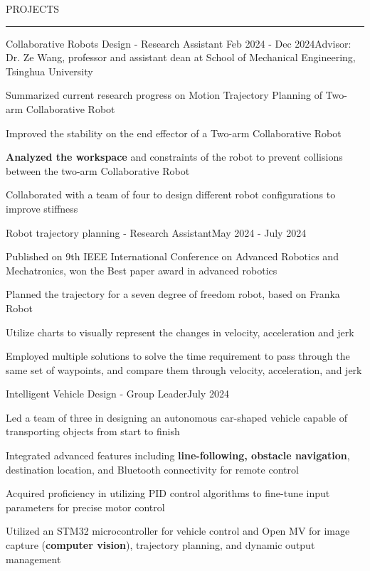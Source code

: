 \documentclass{resume} %
\renewenvironment{rSection}[1]{
\sectionskip
\textcolor{TsinghuaPurple}{\MakeUppercase{#1}}
\sectionlineskip
\hrule
\begin{list}{}{
\setlength{\leftmargin}{0em}
}
\item[]
}{
\end{list}
}
\begin{document}
\begin{rSection}{PROJECTS}

\begin{rSubsection}{Collaborative Robots Design - Research Assistant} {Feb 2024 - Dec 2024}{Advisor: Dr. Ze Wang, professor and assistant dean at School of Mechanical Engineering, Tsinghua University}{}

\item Summarized current research progress on Motion Trajectory Planning of Two-arm Collaborative Robot
\item Improved the stability on the end effector of a Two-arm Collaborative Robot
\item \textbf{Analyzed the workspace }and constraints of the robot to prevent collisions between the two-arm Collaborative Robot
\item Collaborated with a team of four to design different robot configurations to improve stiffness

 
\end{rSubsection}  


\begin{rSubsection}{Robot trajectory planning - Research Assistant}{May 2024 - July 2024}{}{} 
\item Published on 9th IEEE International Conference on Advanced Robotics and Mechatronics, won the Best paper award in advanced robotics
\item Planned the trajectory for a seven degree of freedom robot, based on Franka Robot
\item Utilize charts to visually represent the changes in velocity, acceleration and jerk
\item Employed multiple solutions to solve the time requirement to pass through the same set of waypoints, and compare them through velocity, acceleration, and jerk

\end{rSubsection}



\begin{rSubsection}{Intelligent Vehicle Design - Group Leader}{July 2024}{}{}

\item Led a team of three in designing an autonomous car-shaped vehicle capable of transporting objects from start to finish
\item Integrated advanced features including \textbf{line-following, obstacle navigation}, destination location, and Bluetooth connectivity for remote control
\item Acquired proficiency in utilizing PID control algorithms to fine-tune input parameters for precise motor control
\item Utilized an STM32 microcontroller for vehicle control and Open MV for image capture (\textbf{computer vision}), trajectory planning, and dynamic output management


\end{rSubsection}
\end{rSection}
\end{document}
